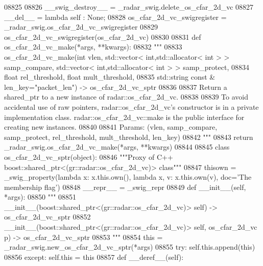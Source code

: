 \begin{DoxyCode}
{{{{{{{{{{{{{{{{{{{{{{{{{{{{{08825 
08826     \_\_swig\_destroy\_\_ = \_radar\_swig.delete\_os\_cfar\_2d\_vc
08827     \_\_del\_\_ = \textcolor{keyword}{lambda} self : \textcolor{keywordtype}{None};
08828 os\_cfar\_2d\_vc\_swigregister = \_radar\_swig.os\_cfar\_2d\_vc\_swigregister
08829 os_cfar_2d_vc_swigregister(os\_cfar\_2d\_vc)
08830 
08831 \textcolor{keyword}{def }os_cfar_2d_vc_make(*args, **kwargs):
08832   \textcolor{stringliteral}{"""}
08833 \textcolor{stringliteral}{    os\_cfar\_2d\_vc\_make(int vlen, std::vector< int,std::allocator< int > > samp\_compare, std::vector<
       int,std::allocator< int > > samp\_protect, }
08834 \textcolor{stringliteral}{        float rel\_threshold, float mult\_threshold, }
08835 \textcolor{stringliteral}{        std::string const & len\_key="packet\_len") -> os\_cfar\_2d\_vc\_sptr}
08836 \textcolor{stringliteral}{}
08837 \textcolor{stringliteral}{    Return a shared\_ptr to a new instance of radar::os\_cfar\_2d\_vc.}
08838 \textcolor{stringliteral}{}
08839 \textcolor{stringliteral}{    To avoid accidental use of raw pointers, radar::os\_cfar\_2d\_vc's constructor is in a private
       implementation class. radar::os\_cfar\_2d\_vc::make is the public interface for creating new instances.}
08840 \textcolor{stringliteral}{}
08841 \textcolor{stringliteral}{    Params: (vlen, samp\_compare, samp\_protect, rel\_threshold, mult\_threshold, len\_key)}
08842 \textcolor{stringliteral}{    """}
08843   \textcolor{keywordflow}{return} \_radar\_swig.os\_cfar\_2d\_vc\_make(*args, **kwargs)
08844 
08845 \textcolor{keyword}{class }os_cfar_2d_vc_sptr(object):
08846     \textcolor{stringliteral}{"""Proxy of C++ boost::shared\_ptr<(gr::radar::os\_cfar\_2d\_vc)> class"""}
08847     thisown = _swig_property(\textcolor{keyword}{lambda} x: x.this.own(), \textcolor{keyword}{lambda} x, v: x.this.own(v), doc=\textcolor{stringliteral}{'The membership flag'})
08848     \_\_repr\_\_ = \_swig\_repr
08849     \textcolor{keyword}{def }__init__(self, *args): 
08850         \textcolor{stringliteral}{"""}
08851 \textcolor{stringliteral}{        \_\_init\_\_(boost::shared\_ptr<(gr::radar::os\_cfar\_2d\_vc)> self) -> os\_cfar\_2d\_vc\_sptr}
08852 \textcolor{stringliteral}{        \_\_init\_\_(boost::shared\_ptr<(gr::radar::os\_cfar\_2d\_vc)> self, os\_cfar\_2d\_vc p) -> os\_cfar\_2d\_vc\_sptr}
08853 \textcolor{stringliteral}{        """}
08854         this = \_radar\_swig.new\_os\_cfar\_2d\_vc\_sptr(*args)
08855         \textcolor{keywordflow}{try}: self.this.append(this)
08856         \textcolor{keywordflow}{except}: self.this = this
08857     \textcolor{keyword}{def }__deref__(self):
}}}}}}}}}}}}}}}}}}}}}}}}}}}}}
\end{DoxyCode}
